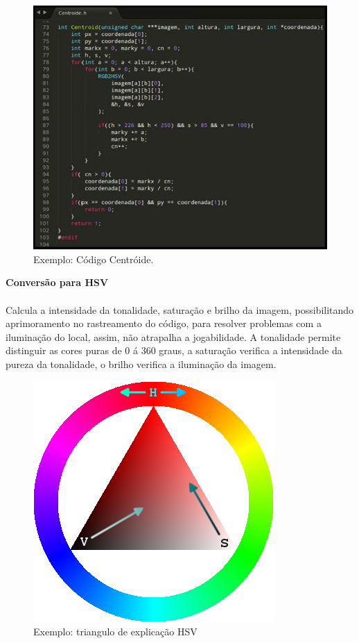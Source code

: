 \documentclass{sciposter}
\begin{document}
\begin{multicols}{3}
\begin{figure}[!htb]
\centering
\includegraphics[scale=1.7]{centroid.png}
\caption{Exemplo: Código Centróide.}
\end{figure}

\textbf{Conversão para HSV} \\ \\
Calcula a intensidade da tonalidade, saturação e brilho da imagem, possibilitando aprimoramento no rastreamento do código, para resolver problemas com a iluminação do local, assim, não atrapalha a jogabilidade. A tonalidade permite distinguir as cores puras de 0 á 360 graus, a saturação verifica a intensidade da pureza da tonalidade, o brilho verifica a iluminação da imagem.

\begin{figure}[!htb]
\centering
\includegraphics[scale=0.7]{Triangulo_HSV.png}
\caption{Exemplo: triangulo de explicação HSV }
\end{figure}


\end{multicols}
\end{document}
